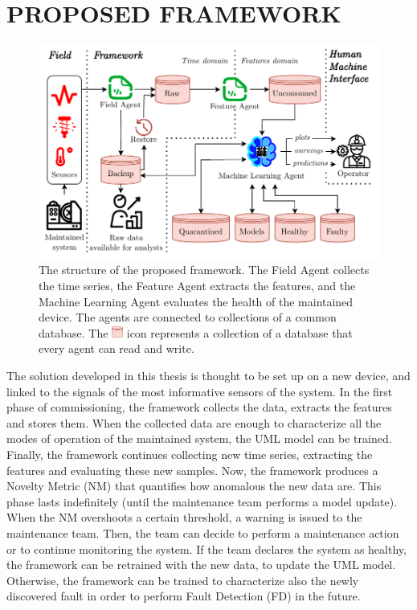 \section{PROPOSED FRAMEWORK}
\label{sec:framework}
\begin{figure}
    \includegraphics[width=\linewidth]{images/Framework_structure.pdf}
    \caption{The structure of the proposed framework. The Field Agent collects the time series, the Feature Agent extracts the features, and the Machine Learning Agent evaluates the health of the maintained device. The agents are connected to collections of a common database. The \includegraphics[height = 1em]{images/DB_icon-cropped.pdf} icon represents a collection of a database that every agent can read and write.}
    \label{fig:framework_structure}
\end{figure}

The solution developed in this thesis is thought to be set up on a new device, and linked to the signals of the most informative sensors of the system.
In the first phase of commissioning, the framework collects the data, extracts the features and stores them. When the collected data are enough to characterize all the modes of operation of the maintained system, the UML model can be trained. Finally, the framework continues collecting new time series, extracting the features and evaluating these new samples. Now, the framework produces a Novelty Metric (NM) that quantifies how anomalous the new data are. 
This phase lasts indefinitely (until the maintenance team performs a model update). When the NM overshoots a certain threshold, a warning is issued to the maintenance team. 
Then, the team can decide to perform a maintenance action or to continue monitoring the system. If the team declares the system as healthy, the framework can be retrained with the new data, to update the UML model. Otherwise, the framework can be trained to characterize also the newly discovered fault in order to perform Fault Detection (FD) in the future.

